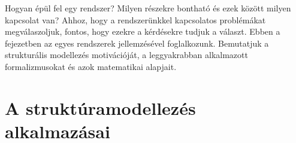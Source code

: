 
\graphicspath{ {./struktura-alapu-modellezes/figures/} }

\newcommand{\yedscale}{0.7}


%	
%	
%	
%	

Hogyan épül fel egy rendszer? Milyen részekre bontható és ezek között milyen kapcsolat van? Ahhoz, hogy a rendszerünkkel kapcsolatos problémákat megválaszoljuk, fontos, hogy ezekre a kérdésekre tudjuk a választ. Ebben a fejezetben az egyes rendszerek  jellemzésével foglalkozunk. Bemutatjuk a strukturális modellezés motivációját, a leggyakrabban alkalmazott formalizmusokat és azok matematikai alapjait.




\section{A struktúramodellezés alkalmazásai}
\label{sec:motivacio}

